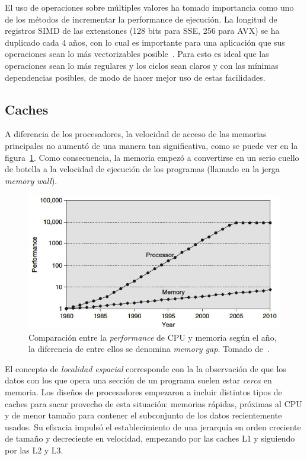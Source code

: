 El uso de operaciones sobre m\'ultiples valores ha tomado importancia como uno de los m\'etodos de incrementar la performance de ejecuci\'on.
La longitud de registros SIMD de las extensiones (128 bits para SSE, 256 para AVX) se ha duplicado cada 4 a\~nos, con lo cual es importante para una aplicaci\'on que sus operaciones sean lo m\'as vectorizables posible~\cite{HennessyPatterson}.
Para esto es ideal que las operaciones sean lo m\'as regulares y los ciclos sean claros y con las m\'inimas dependencias posibles, de modo de hacer mejor uso de estas facilidades.

\subsection{Caches}

A diferencia de los procesadores, la velocidad de acceso de las memorias principales no aument\'o de una manera tan significativa, como se puede ver en la figura~\ref{fig:cpu_vs_mem}. Como consecuencia, la memoria empez\'o a convertirse en un serio cuello de botella a la velocidad de ejecuci\'on de los programas (llamado en la jerga \textit{memory wall}).

\begin{figure}[htbp]
    \centering
    \includegraphics[width=\plotwidth]{images/cpu_vs_memory.jpg}
    \caption{Comparaci\'on entre la \textit{performance} de CPU y memoria seg\'un el a\~no, la diferencia de entre ellos se denomina \textit{memory gap}. Tomado de~\cite{HennessyPatterson}.}
    \label{fig:cpu_vs_mem}

\end{figure}

El concepto de \textit{localidad espacial} corresponde con la la observaci\'on de que los datos con los que opera una secci\'on de un programa suelen estar \emph{cerca} en memoria.
Los dise\~nos de procesadores empezaron a incluir distintos tipos de caches para sacar provecho de esta situaci\'on: memorias r\'apidas, pr\'oximas al CPU y de menor tama\~no para contener el subconjunto de los datos recientemente usados.
Su eficacia impuls\'o el establecimiento de una jerarqu\'ia en orden creciente de tama\~no y decreciente en velocidad, empezando por las caches L1 y siguiendo por las L2 y L3.

